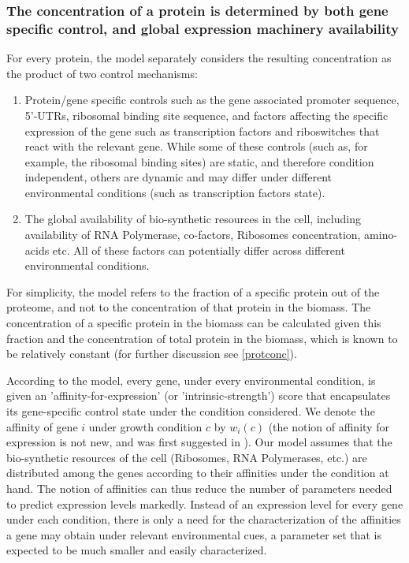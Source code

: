 \documentclass[notitlepage]{article}
\begin{document}
\subsubsection{The concentration of a protein is determined by both gene specific control, and global expression machinery availability}
For every protein, the model separately considers the resulting concentration as the product of two control mechanisms:
\begin{enumerate}
\item Protein/gene specific controls such as the gene associated promoter sequence, 5'-UTRs, ribosomal binding site sequence, and factors affecting the specific expression of the gene such as transcription factors and riboswitches that react with the relevant gene.
  While some of these controls (such as, for example, the ribosomal binding sites) are static, and therefore condition independent, others are dynamic and may differ under different environmental conditions (such as transcription factors state).
\item The global availability of bio-synthetic resources in the cell, including availability of RNA Polymerase, co-factors, Ribosomes concentration, amino-acids etc.
  All of these factors can potentially differ across different environmental conditions.
\end{enumerate}
For simplicity, the model refers to the fraction of a specific protein out of the proteome, and not to the concentration of that protein in the biomass.
The concentration of a specific protein in the biomass can be calculated given this fraction and the concentration of total protein in the biomass, which is known to be relatively constant \cite{Bremer1987,Scott2014} (for further discussion see \ref{protconc}).

According to the model, every gene, under every environmental condition, is given an 'affinity-for-expression' (or 'intrinsic-strength') score that encapsulates its gene-specific control state under the condition considered.
We denote the affinity of gene $i$ under growth condition $c$ by $w_i(c)$ (the notion of affinity for expression is not new, and was first suggested in  \cite{Maaloe1969}).
Our model assumes that the bio-synthetic resources of the cell (Ribosomes, RNA Polymerases, etc.) are distributed among the genes according to their affinities under the condition at hand.
The notion of affinities can thus reduce the number of parameters needed to predict expression levels markedly.
Instead of an expression level for every gene under each condition, there is only a need for the characterization of the affinities a gene may obtain under relevant environmental cues, a parameter set that is expected to be much smaller and easily characterized.
\end{document}
